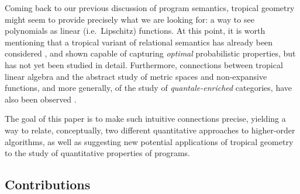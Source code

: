 \documentclass[conference]{IEEEtran}
\begin{document}
Coming back to our previous discussion of program semantics, tropical geometry might seem to provide precisely what we are looking for: a way to see polynomials as linear (i.e.~Lipschitz) functions.
At this point, it is worth mentioning that a tropical variant of relational semantics has already been considered \cite{}, and shown capable of capturing \emph{optimal} probabilistic properties, but has not yet been studied in detail. Furthermore, connections between tropical linear algebra and the abstract study of metric spaces and non-expansive functions, and more generally, of the study of \emph{quantale-enriched} categories, have also been observed \cite{}.

The goal of this paper is to make such intuitive connections precise, yielding a way to relate, conceptually, two different quantitative approaches to higher-order algorithms, as well as suggesting new potential applications of tropical geometry to the study of quantitative properties of programs.


\subsection{Contributions}
\end{document}
